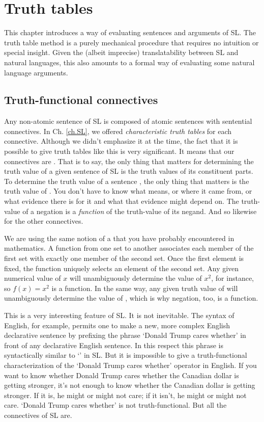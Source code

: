 \chapter{Truth tables}
\label{ch.TruthTables}

This chapter introduces a way of evaluating sentences and arguments of SL. The truth table method is a purely mechanical procedure that requires no intuition or special insight. Given the (albeit imprecise) translatability between SL and natural languages, this also amounts to a formal way of evaluating some natural language arguments.

\section{Truth-functional connectives}

Any non-atomic sentence of SL is composed of atomic sentences with sentential connectives. In Ch. \ref{ch.SL}, we offered \emph{characteristic truth tables} for each connective. Although we didn't emphasize it at the time, the fact that it is possible to give truth tables like this is very significant. It means that our connectives are . That is to say, the only thing that matters for determining the truth value of a given sentence of SL is the truth values of its constituent parts. To determine the truth value of a sentence \enot\metaA{}, the only thing that matters is the truth value of \metaA{}. You don't have to know what \metaA{} means, or where it came from, or what evidence there is for it and what that evidence might depend on. The truth-value of a negation is a \emph{function} of the truth-value of its negand. And so likewise for the other connectives.

We are using the same notion of a  that you have probably encountered in mathematics. A function from one set to another associates each member of the first set with exactly one member of the second set. Once the first element is fixed, the function uniquely selects an element of the second set. Any given numerical value of $x$ will unambiguously determine the value of $x^{2}$, for instance, so $f(x)=x^{2}$ is a function. In the same way, any given truth value of \metaA{} will unambiguously determine the value of \enot\metaA{}, which is why negation, too, is a function.

This is a very interesting feature of SL. It is not inevitable. The syntax of English, for example, permits one to make a new, more complex English declarative sentence by prefixing the phrase `Donald Trump cares whether' in front of any declarative English sentence. In this respect this phrase is syntactically similar to `\enot' in SL. But it is impossible to give a truth-functional characterization of the `Donald Trump cares whether' operator in English. If you want to know whether Donald Trump cares whether  the Canadian dollar is getting stronger, it's not enough to know whether the Canadian dollar is getting stronger. If it is, he might or might not care; if it isn't, he might or might not care. `Donald Trump cares whether' is not truth-functional. But all the connectives of SL are.

